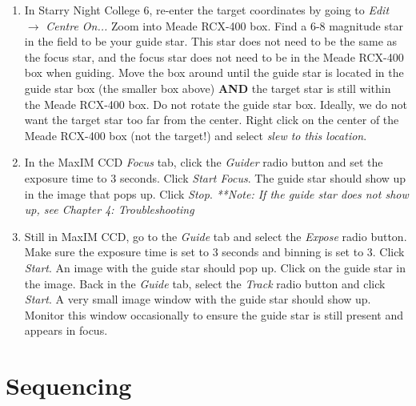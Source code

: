 \documentclass[11pt]{report}
\begin{document}
\begin{enumerate}
\item In Starry Night College 6, re-enter the target coordinates by going to \emph{Edit} {$\rightarrow$} \emph{Centre On...} Zoom into Meade RCX-400 box. Find a 6-8 magnitude star in the field to be your guide star. This star does not need to be the same as the focus star, and the focus star does not need to be in the Meade RCX-400 box when guiding. Move the box around until the guide star is located in the guide star box (the smaller box above)  {\bf AND} the target star is still within the Meade RCX-400 box. Do not rotate the guide star box. Ideally, we do not want the target star too far from the center. Right click on the center of the Meade RCX-400 box (not the target!) and select \emph{slew to this location}.
\item In the MaxIM CCD \emph{Focus} tab, click the \emph{Guider} radio button and set the exposure time to 3 seconds. Click \emph{Start Focus}. The guide star should show up in the image that pops up. Click \emph{Stop}. \emph{**Note: If the guide star does not show up, see Chapter 4: Troubleshooting}
\item Still in MaxIM CCD, go to the \emph{Guide} tab and select the \emph{Expose} radio button. Make sure the exposure time is set to 3 seconds and binning is set to 3. Click \emph{Start}. An image with the guide star should pop up. Click on the guide star in the image. Back in the \emph{Guide} tab, select the \emph{Track} radio button and click \emph{Start}. A very small image window with the guide star should show up. Monitor this window occasionally to ensure the guide star is still present and appears in focus.
\end{enumerate}

\section{Sequencing}
\end{document}
